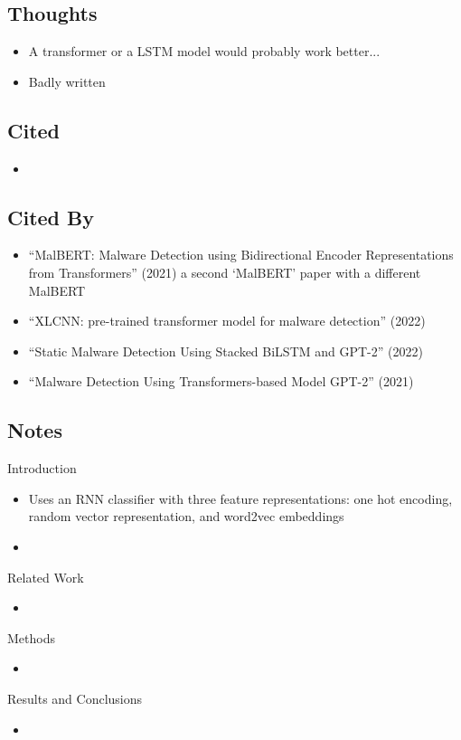 \documentclass{article}
\begin{document}
\subsection*{Thoughts}
\begin{itemize}
\item A transformer or a LSTM model would probably work better...
\item Badly written
\end{itemize}

\subsection*{Cited}
\begin{itemize}
\item
\end{itemize}

\subsection*{Cited By}
\begin{itemize}
\item ``MalBERT: Malware Detection using Bidirectional Encoder Representations from Transformers'' (2021) a second `MalBERT' paper with a different MalBERT
\item ``XLCNN: pre-trained transformer model for malware detection'' (2022)
\item ``Static Malware Detection Using Stacked BiLSTM and GPT-2'' (2022)
\item ``Malware Detection Using Transformers-based Model GPT-2'' (2021)
\end{itemize}

\subsection*{Notes}

Introduction
\begin{itemize}
\item Uses an RNN classifier with three feature representations: one hot encoding, random vector representation, and word2vec embeddings
\item 
\end{itemize}
Related Work
\begin{itemize}
\item
\end{itemize}
Methods
\begin{itemize}
\item
\end{itemize}
Results and Conclusions
\begin{itemize}
\item
\end{itemize}
\end{document}
